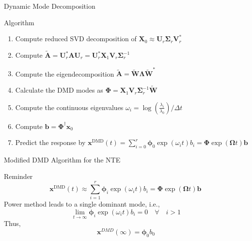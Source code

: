 \documentclass[fleqn]{beamer}
\newcommand{\mat}[1]{\ensuremath{\bm{#1}}}
\newcommand{\mata}[1]{\ensuremath{\tilde{\bm{#1}}}}
\renewcommand{\vec}[1]{\ensuremath{\bm{#1}}}
\newcommand{\veca}[1]{\ensuremath{\tilde{\bm{#1}}}}
\begin{document}
\begin{frame}{Dynamic Mode Decomposition}
    \begin{block}{Algorithm}
        \begin{enumerate}
            \item Compute reduced SVD decomposition of $\mat{X}_0 \approx \mat{U}_r \boldsymbol{\Sigma}_r \mat{V}_r^*$
            \pause
            \item Compute $\mata{A}=\mat{U}_r^*\mat{A}\mat{U}_r=\mat{U}_r^*\mat{X}_1\mat{V}_r\boldsymbol{\Sigma}_r^{-1}$
            \pause
            \item Compute the eigendecomposition $\mata{A}=\veca{W}\boldsymbol{\Lambda}\veca{W}^*$
            \pause
            \item Calculate the DMD modes as ${\boldsymbol{\Phi}}=\mat{X}_1\mat{V}_r\boldsymbol{\Sigma}_r^{-1}\mata{W}$
            \pause
            \item Compute the continuous eigenvalues $\omega_i = \log(\frac{\lambda_i}{\lambda_0}) / \Delta t$
            \pause
            \item Compute $\vec{b}=\boldsymbol{\Phi}^\dag \vec{x}_0$
            \item Predict the response by $\vec{x}^\text{DMD}(t) = \sum\limits_{i=0}^r\vec\phi_0\exp(\omega_i t)b_i=\boldsymbol{\Phi}\exp(\boldsymbol\Omega t)\vec{b}$
        \end{enumerate}
    \end{block}
\end{frame}

\begin{frame}{Modified DMD Algorithm for the NTE \footnotemark}
    \begin{block}{}
        Reminder
        \begin{equation*}
            \vec{x}^\text{DMD}(t) \approx \sum^{r}_{i=1} \vec{\phi}_i \exp(\omega_i t) b_i = \boldsymbol{\Phi}\exp(\boldsymbol\Omega t)\vec{b} \, 
        \end{equation*}
        Power method leads to a single dominant mode, i.e.,
        \begin{equation*}
            \lim\limits_{t\rightarrow\infty}\vec{\phi}_i \exp(\omega_i t) b_i = 0 \quad\forall\quad i > 1
        \end{equation*}
        Thus,
        \begin{equation*}
            \vec{x}^{DMD}(\infty) = \vec{\phi}_0 b_0 
        \end{equation*}
    \end{block}
\end{frame} 
\end{document}
